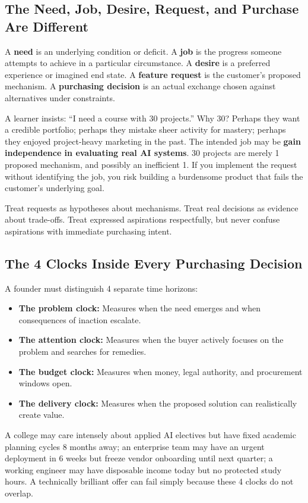 \subsection{The Need, Job, Desire, Request, and Purchase Are Different}

A \textbf{need} is an underlying condition or deficit. A \textbf{job} is the progress someone attempts to achieve in a particular circumstance. A \textbf{desire} is a preferred experience or imagined end state. A \textbf{feature request} is the customer's proposed mechanism. A \textbf{purchasing decision} is an actual exchange chosen against alternatives under constraints.

A learner insists: ``I need a course with 30 projects.'' Why 30? Perhaps they want a credible portfolio; perhaps they mistake sheer activity for mastery; perhaps they enjoyed project-heavy marketing in the past. The intended job may be \textbf{gain independence in evaluating real AI systems}. 30 projects are merely 1 proposed mechanism, and possibly an inefficient 1. If you implement the request without identifying the job, you risk building a burdensome product that fails the customer's underlying goal.

Treat requests as hypotheses about mechanisms. Treat real decisions as evidence about trade-offs. Treat expressed aspirations respectfully, but never confuse aspirations with immediate purchasing intent.

\subsection{The 4 Clocks Inside Every Purchasing Decision}

A founder must distinguish 4 separate time horizons:
\begin{itemize}[leftmargin=1.2em,itemsep=0.2ex]
  \item \textbf{The problem clock:} Measures when the need emerges and when consequences of inaction escalate.
  \item \textbf{The attention clock:} Measures when the buyer actively focuses on the problem and searches for remedies.
  \item \textbf{The budget clock:} Measures when money, legal authority, and procurement windows open.
  \item \textbf{The delivery clock:} Measures when the proposed solution can realistically create value.
\end{itemize}

A college may care intensely about applied AI electives but have fixed academic planning cycles 8 months away; an enterprise team may have an urgent deployment in 6 weeks but freeze vendor onboarding until next quarter; a working engineer may have disposable income today but no protected study hours. A technically brilliant offer can fail simply because these 4 clocks do not overlap.

